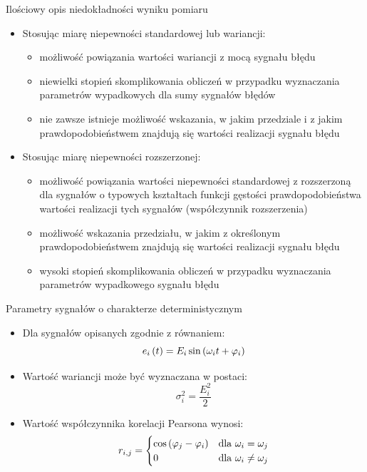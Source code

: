 \documentclass[12pt, polish, aspectratio = 169]{beamer}
\begin{document}
\begin{frame}{Ilościowy opis niedokładności wyniku pomiaru}
\begin{itemize}
\item Stosując miarę niepewności standardowej lub wariancji:
	\begin{itemize}
	\item możliwość powiązania wartości wariancji z mocą sygnału błędu
	\item niewielki stopień skomplikowania obliczeń w przypadku wyznaczania parametrów wypadkowych dla sumy sygnałów błędów
	\item nie zawsze istnieje możliwość wskazania, w jakim przedziale i z jakim prawdopodobieństwem znajdują się wartości realizacji sygnału błędu 
	\end{itemize}
\item Stosując miarę niepewności rozszerzonej:
	\begin{itemize}
	\item możliwość powiązania wartości niepewności standardowej z rozszerzoną dla sygnałów o typowych kształtach funkcji gęstości prawdopodobieństwa wartości realizacji tych sygnałów (współczynnik rozszerzenia)
	\item możliwość wskazania przedziału, w jakim z określonym prawdopodobieństwem znajdują się wartości realizacji sygnału błędu
	\item wysoki stopień skomplikowania obliczeń w przypadku wyznaczania parametrów wypadkowego sygnału błędu
	\end{itemize}
\end{itemize}
\end{frame}

\begin{frame}{Parametry sygnałów o charakterze deterministycznym}
\begin{itemize}
\item Dla sygnałów opisanych zgodnie z równaniem:
\begin{equation}
e_{i} \left(t\right) = E_{i} \sin \left( \omega_{i} t + \varphi_{i} \right) \label{eq:dyn_harm}
\end{equation}
\item Wartość wariancji może być wyznaczana w postaci:
\begin{equation}
\sigma_{i}^{2} = \frac{E_{i}^{2}}{2} \label{eq:dyn_var}
\end{equation}
\item Wartość współczynnika korelacji Pearsona wynosi:
\begin{equation}
r_{i,j} =
\begin{cases}
\cos \left( \varphi_{j} - \varphi_{i} \right) & $dla $ \omega_{i} = \omega_{j} \\
0                                             & $dla $ \omega_{i} \ne \omega_{j}
\end{cases}
\label{eq:dyn_corr}
\end{equation}
\end{itemize}
\end{frame}
\end{document}
